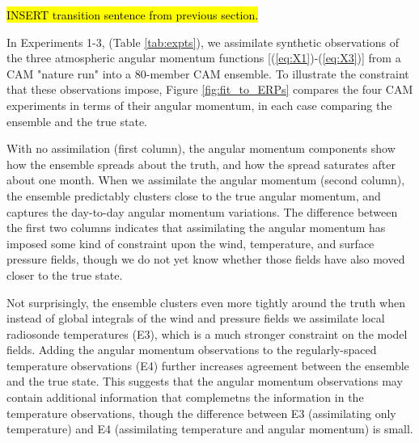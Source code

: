 \hl{INSERT transition sentence from previous section.}

In Experiments 1-3, (Table \ref{tab:expts}), we assimilate synthetic observations of the three atmospheric angular momentum functions [(\ref{eq:X1})-(\ref{eq:X3})] from a CAM "nature run" into a 80-member CAM ensemble. 
To illustrate the constraint that these observations impose, Figure \ref{fig:fit_to_ERPs} compares the four CAM experiments in terms of their angular momentum, in each case comparing the ensemble and the true state.

With no assimilation (first column), the angular momentum components show how the ensemble spreads about the truth, and how the spread saturates after about one month.
When we assimilate the angular momentum (second column), the ensemble predictably clusters close to the true angular momentum, and captures the day-to-day angular momentum variations. 
The difference between the first two columns indicates that assimilating the angular momentum has imposed some kind of constraint upon the wind, temperature, and surface pressure fields, though we do not yet know whether those fields have also moved closer to the true state. 

Not surprisingly, the ensemble clusters even more tightly around the truth when instead of global integrals of the wind and pressure fields we assimilate local radiosonde temperatures (E3), which is a much stronger constraint on the model fields. 
Adding the angular momentum observations to the regularly-spaced temperature observations (E4) further increases agreement between the ensemble and the true state.  
This suggests that the angular momentum observations may contain additional information that complemetns the information in the temperature observations, though the difference between E3 (assimilating only temperature) and E4 (assimilating temperature and angular momentum) is small.  
